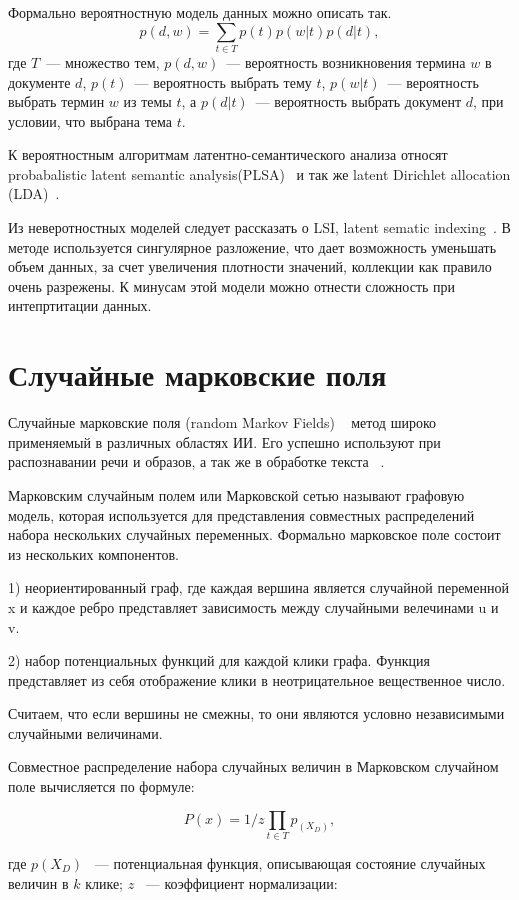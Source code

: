 \documentclass[annotation,times,page4]{itmo-student-thesis}
\begin{document}
Формально вероятностную модель данных можно описать так.
\[
    p(d, w) = \sum_{t \in T} p(t)p(w|t)p(d|t),
\]
где $T$~--- множество тем, $p(d, w)$~--- вероятность возникновения
термина $w$ в документе $d$, $p(t)$~--- вероятность выбрать тему $t$,
$p(w|t)$~--- вероятность выбрать термин $w$ из темы $t$, а
$p(d|t)$~--- вероятность выбрать документ $d$, при условии, что
выбрана тема $t$.

К вероятностным алгоритмам латентно-семантического анализа относят  probabalistic latent semantic analysis(PLSA)~\cite{chemudugunta2007modeling} и так же latent Dirichlet allocation (LDA)~\cite{blei2003latent}.

Из неверотностных моделей следует рассказать о LSI, latent sematic indexing~\cite{deerwester1990indexing}. В методе используется сингулярное разложение, что дает возможность уменьшать объем данных, за счет увеличения плотности значений, коллекции как правило очень разрежены. К минусам этой модели можно отнести сложность при интепртитации данных. 

\section{Случайные марковские поля}
Случайные марковские поля (random Markov Fields) ~\cite{kindermann1980markov} метод широко применяемый в различных областях ИИ. Его успешно используют при распознавании речи и образов, а так же в обработке текста ~\cite{li2009markov, romanenko2014}.

Марковским случайным полем или Марковской сетью называют графовую модель, которая используется для представления совместных распределений набора нескольких случайных переменных. Формально марковское поле состоит из нескольких компонентов.

1) неориентированный граф, где каждая вершина является случайной переменной x и каждое ребро представляет зависимость между случайными велечинами u и v.

2) набор потенциальных функций для каждой клики графа. Функция представляет из себя отображение клики в неотрицательное вещественное число.

Считаем, что если вершины не смежны, то они являются условно независимыми случайными величинами.

Совместное распределение набора случайных величин в Марковском случайном поле вычисляется по формуле:

\[
    P(x) = 1/z\prod_{t \in T} p_(X_{D}),
\]

где $p (X_{D})$ ~--- потенциальная функция, описывающая состояние случайных величин в $k$ клике; $z$ ~--- коэффициент нормализации:
\end{document}
